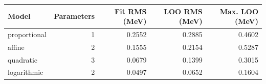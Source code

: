\begin{tabular}{lrrrr}
\toprule
Model & Parameters & Fit RMS (MeV) & LOO RMS (MeV) & Max. LOO (MeV) \\
\midrule
proportional & 1 & 0.2552 & 0.2885 & 0.4602 \\
affine & 2 & 0.1555 & 0.2154 & 0.5287 \\
quadratic & 3 & 0.0679 & 0.1399 & 0.3015 \\
logarithmic & 2 & 0.0497 & 0.0652 & 0.1604 \\
\bottomrule
\end{tabular}
